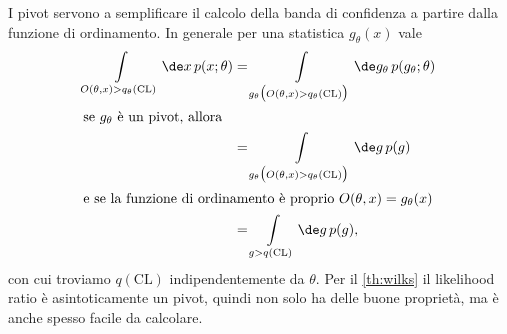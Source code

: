 I pivot servono a semplificare il calcolo della banda di confidenza a partire dalla funzione di ordinamento.
In generale per una statistica $g_\theta(x)$ vale
\begin{align*}
	\int\limits_{O(\theta,x)>q_\theta(\mathrm{CL})} \de x\, p(x;\theta)
	&= \int\limits_{g_\theta\big(O(\theta,x)>q_\theta(\mathrm{CL})\big)} \de g_\theta\, p(g_\theta;\theta) \\
	\intertext{se $g_\theta$ è un pivot, allora}
	&= \int\limits_{g_\theta\big(O(\theta,x)>q_\theta(\mathrm{CL})\big)} \de g\, p(g) \\
	\intertext{e se la funzione di ordinamento è proprio $O(\theta,x)=g_\theta(x)$}
	&= \int\limits_{g>q(\mathrm{CL})} \de g\, p(g),
\end{align*}
con cui troviamo $q(\mathrm{CL})$ indipendentemente da $\theta$.
Per il \autoref{th:wilks} il likelihood ratio è asintoticamente un pivot,
quindi non solo ha delle buone proprietà,
ma è anche spesso facile da calcolare.
